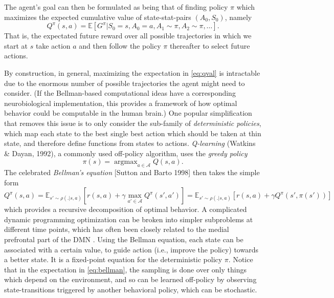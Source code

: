 \documentclass{article} %
\DeclareMathOperator{\argmax}{argmax}
\begin{document}
The agent's goal can then be formulated as being that of finding policy $\pi$ which maximizes the
expected cumulative value of state-stat-pairs $(A_0,S_0)$, namely
\begin{equation}
  \label{eq:qval}
  Q^{\pi}(s,a) = \mathbb E [G^\pi|S_0=s,A_0=a,A_1 \sim \pi,A_2 \sim \pi,\ldots].
\end{equation}
That is, the expectated future reward over all possible trajectories in which we start at $s$ take
action $a$ and then follow the policy $\pi$ thereafter to select future actions.

By construction, in general, maximizing the expectation in  \eqref{eq:qval} is intractable due to
the enormous number of possible trajectories the agent might need to
consider.
(If the Bellman-based computational ideas have a corresponding
neurobiological implementation, this provides a framework of how
optimal behavior could be computable in the human brain.)
One popular simplification that removes this issue is to only consider the sub-family of
\textit{deterministic policies}, which map each state to the best single best action which
should be taken at thin state, and therefore define functions from states to actions.
\textit{Q-learning} (Watkins \& Dayan, 1992), a commonly used off-policy algorithm, uses the
\textit{greedy policy}
\begin{equation}
  \pi(s) = \argmax_{a \in \mathcal A}{Q}(s, a).
  \label{eq:qlearning}
\end{equation}
The celebrated \textit{Bellman's equation} [Sutton and Barto 1998] then takes the simple form
\begin{equation}
  Q^\pi(s, a) = \mathbb E_{s' \sim \rho(.|s,a)} [r(s,a) + \gamma \max_{a' \in \mathcal A}Q^\pi(s', a')]
  = \mathbb E_{s' \sim \rho(.|s,a)} [r(s,a) + \gamma Q^\pi(s', \pi(s'))]
  \label{eq:bellman}
\end{equation}
which provides a recursive decomposition of optimal behavior.
A complicated dynamic programming optimization can be
broken into simpler subproblems at different time points,
which has often been closely related to the medial prefrontal part of the DMN
\citep{koechlin1999role, braver2002role}.
Using the Bellman equation, each state can be associated with a certain value,
to guide action (i.e., improve the policy) towards a better state.
It is a fixed-point equation for the deterministic policy $\pi$.
Notice that in the expectation in \eqref{eq:bellman}, the sampling is done over only things which
depend on the environment, and so can be learned off-policy by observing state-transitions
triggered by another behavioral policy, which can be stochastic.
\end{document}
